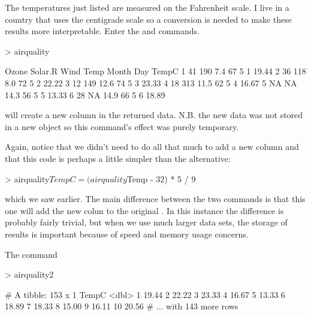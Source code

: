 The temperatures just listed are measured on the Fahrenheit scale. I live in a country that uses the centigrade scale so a conversion is needed to make these results more interpretable. Enter the  and  
 commands.  
 

\begin{Schunk}
\begin{Sinput}
> airquality %>% mutate(TempC = (Temp - 32) * 5 / 9) %>% head() 
\end{Sinput}
\begin{Soutput}
  Ozone Solar.R Wind Temp Month Day TempC
1    41     190  7.4   67     5   1 19.44
2    36     118  8.0   72     5   2 22.22
3    12     149 12.6   74     5   3 23.33
4    18     313 11.5   62     5   4 16.67
5    NA      NA 14.3   56     5   5 13.33
6    28      NA 14.9   66     5   6 18.89
\end{Soutput}
\end{Schunk}

will create a new column in the returned data. N.B. the new data was not stored in a new object so this command's effect was purely temporary. 
 
Again, notice that we didn't need to do all that much to add a new column and that this code is perhaps a little simpler than the alternative: 

\begin{Schunk}
\begin{Sinput}
> airquality$TempC = (airquality$Temp - 32) * 5 / 9 
\end{Sinput}
\end{Schunk}

which we saw earlier. The main difference between the two commands is that this one will add the new colun to the original . 
In this instance the difference is probably fairly trivial, but when we use much larger data sets, the storage of results is important because of speed and memory usage concerns. 
 
The command 

\begin{Schunk}
\begin{Sinput}
> airquality2 %>% transmute(TempC = (Temp - 32) * 5 / 9) 
\end{Sinput}
\begin{Soutput}
# A tibble: 153 x 1
   TempC
   <dbl>
 1 19.44
 2 22.22
 3 23.33
 4 16.67
 5 13.33
 6 18.89
 7 18.33
 8 15.00
 9 16.11
10 20.56
# ... with 143 more rows
\end{Soutput}
\end{Schunk}

